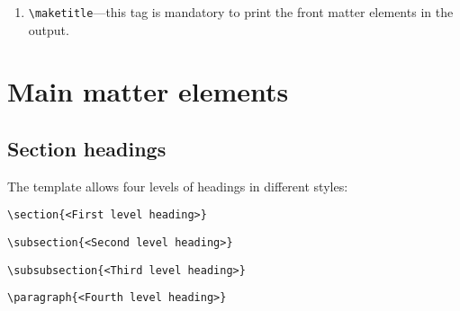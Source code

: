 \documentclass{article}
\begin{document}
\begin{enumerate}
{\fontsize{7}{10}\selectfont\begin{tabular}{|l|l|l|l|l|} \hline
\verb+\orgdiv{. . .}+ & \verb+\orgname{. . .}+ & \verb+\orgaddress{. . .}+ & \verb+\country{. . .}+ & \verb+\postcode{. . .}+ \\ \hline
\verb+\street{. . .}+ & \verb+\city{. . .}+ & \verb+\state{. . .}+ & \verb+\abstract{. . .}+ & \verb+\keywords{. . .}+ \\ \hline
\verb+\received{. . .}+ & \verb+\revised{. . .}+ & \verb+\accepted{. . .}+ &  &  \\ \hline
\end{tabular}}

\item \verb+\maketitle+---this tag is mandatory to print the front matter elements in the output.

\end{enumerate}


\section{Main matter elements }
\subsection{Section headings}
The template allows four levels of headings in different styles:

\medskip

\verb+\section{<First level heading>} +

\verb+\subsection{<Second level heading>} +

\verb+\subsubsection{<Third level heading>}+

\verb+\paragraph{<Fourth level heading>} +
\end{document}
